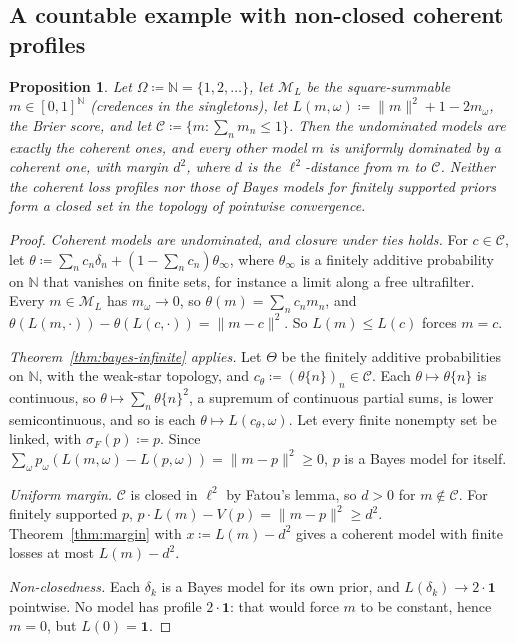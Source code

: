 \documentclass[11pt]{article}
\newtheorem{proposition}[theorem]{Proposition}
\theoremstyle{definition}
\theoremstyle{remark}
\newcommand{\N}{\mathbb N}
\newcommand{\M}{\mathcal M}
\newcommand{\C}{\mathcal C}
\newcommand{\one}{\mathbf 1}
\begin{document}
\subsection{A countable example with non-closed coherent profiles}
\begin{proposition}\label{prop:countable}
Let $\Omega\coloneqq\N=\{1,2,\dots\}$, let $\M_L$ be the square-summable $m\in[0,1]^\N$ (credences in the singletons), let $L(m,\omega)\coloneqq\lVert m\rVert^2+1-2m_\omega$, the Brier score, and let $\C\coloneqq\{m:\sum_nm_n\le1\}$. Then the undominated models are exactly the coherent ones, and every other model $m$ is uniformly dominated by a coherent one, with margin $d^2$, where $d$ is the $\ell^2$-distance from $m$ to $\C$. Neither the coherent loss profiles nor those of Bayes models for finitely supported priors form a closed set in the topology of pointwise convergence.
\end{proposition}
\begin{proof}
\emph{Coherent models are undominated, and closure under ties holds.} For $c\in\C$, let $\theta\coloneqq\sum_nc_n\delta_n+(1-\sum_nc_n)\theta_\infty$, where $\theta_\infty$ is a finitely additive probability on $\N$ that vanishes on finite sets, for instance a limit along a free ultrafilter. Every $m\in\M_L$ has $m_\omega\to0$, so $\theta(m)=\sum_nc_nm_n$, and $\theta(L(m,\cdot))-\theta(L(c,\cdot))=\lVert m-c\rVert^2$. So $L(m)\le L(c)$ forces $m=c$.

\emph{Theorem~\ref{thm:bayes-infinite} applies.} Let $\Theta$ be the finitely additive probabilities on $\N$, with the weak-star topology, and $c_\theta\coloneqq(\theta\{n\})_n\in\C$. Each $\theta\mapsto\theta\{n\}$ is continuous, so $\theta\mapsto\sum_n\theta\{n\}^2$, a supremum of continuous partial sums, is lower semicontinuous, and so is each $\theta\mapsto L(c_\theta,\omega)$. Let every finite nonempty set be linked, with $\sigma_F(p)\coloneqq p$. Since $\sum_\omega p_\omega(L(m,\omega)-L(p,\omega))=\lVert m-p\rVert^2\ge0$, $p$ is a Bayes model for itself.

\emph{Uniform margin.} $\C$ is closed in $\ell^2$ by Fatou's lemma, so $d>0$ for $m\notin\C$. For finitely supported $p$, $p\cdot L(m)-V(p)=\lVert m-p\rVert^2\ge d^2$. Theorem~\ref{thm:margin} with $x\coloneqq L(m)-d^2$ gives a coherent model with finite losses at most $L(m)-d^2$.

\emph{Non-closedness.} Each $\delta_k$ is a Bayes model for its own prior, and $L(\delta_k)\to2\cdot\one$ pointwise. No model has profile $2\cdot\one$: that would force $m$ to be constant, hence $m=0$, but $L(0)=\one$.
\end{proof}
\end{document}
